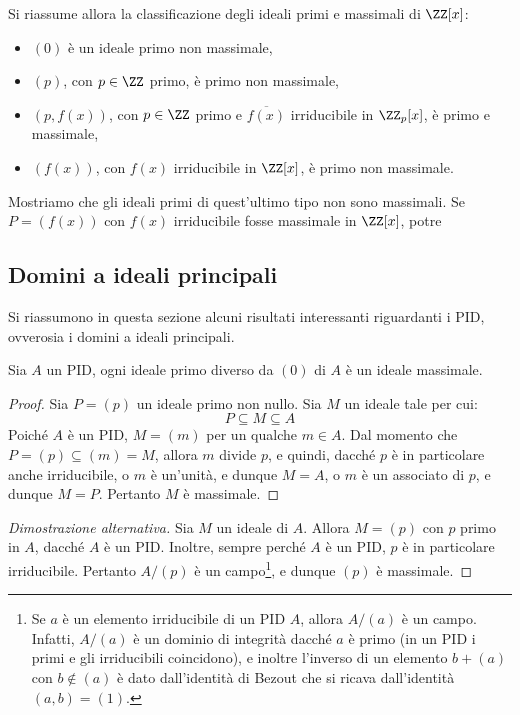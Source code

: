 \documentclass[11pt]{scrartcl}
\begin{document}
	Si riassume allora la classificazione degli ideali primi e massimali di $\ZZ[x]$:
	\begin{itemize}
		\item $(0)$ è un ideale primo non massimale,
		\item $(p)$, con $p \in \ZZ$ primo, è primo non massimale,
		\item $(p, f(x))$, con $p \in \ZZ$ primo e $\overline{f(x)}$ irriducibile
		in $\ZZ_p[x]$, è primo e massimale,
		\item $(f(x))$, con $f(x)$ irriducibile in $\ZZ[x]$, è primo non massimale.
	\end{itemize}
	
	
	
	Mostriamo che gli ideali primi di quest'ultimo tipo non sono massimali.
	Se $P = (f(x))$ con $f(x)$ irriducibile fosse massimale in $\ZZ[x]$, potre
	
	\newpage
	
	\subsection{Domini a ideali principali}
	
	Si riassumono in questa sezione alcuni risultati interessanti riguardanti
	i PID, ovverosia i domini a ideali principali.
	
	\begin{proposition}
		\label{prop:pid_ideali}
		Sia $A$ un PID, ogni ideale primo diverso da $(0)$ di $A$ è un ideale 
		massimale.
	\end{proposition}
	
	\begin{proof}
		Sia $P = (p)$ un ideale primo non nullo. Sia
		$M$ un ideale tale per cui:
		\[
		P \subseteq M \subseteq A
		\]
		Poiché $A$ è un PID, $M = (m)$ per un qualche $m \in A$. Dal momento che
		$P = (p) \subseteq (m) = M$, allora $m$ divide $p$, e quindi, dacché
		$p$ è in particolare anche irriducibile, o $m$ è
		un'unità, e dunque $M = A$, o $m$ è un associato di $p$, e dunque $M = P$.
		Pertanto $M$ è massimale.
	\end{proof}
	
	\begin{proof}[Dimostrazione alternativa]
		Sia $M$ un ideale di $A$. Allora $M = (p)$ con $p$ primo in $A$, dacché
		$A$ è un PID. Inoltre, sempre perché $A$ è un PID, $p$
		è in particolare irriducibile. Pertanto $A/(p)$ è un campo\footnote{
			Se $a$ è un elemento irriducibile di un PID $A$, allora
			$A/(a)$ è un campo. Infatti, $A/(a)$ è un dominio di integrità
			dacché $a$ è primo (in un PID i primi e gli irriducibili coincidono),
			e inoltre l'inverso di un elemento $b + (a)$ con $b \notin (a)$ è dato dall'identità
			di Bezout che si ricava dall'identità $(a, b) = (1)$.
		}, e dunque
		$(p)$ è massimale.
	\end{proof}
	
\end{document}
